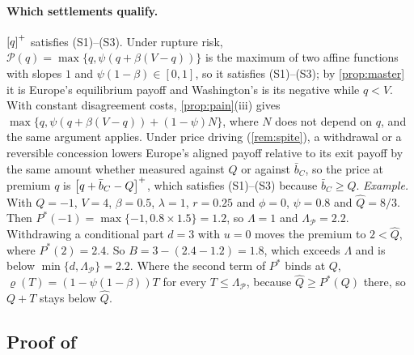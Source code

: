 \paragraph{Which settlements qualify.} $\left[q\right]^{+}$ satisfies (S1)--(S3). Under rupture risk, $\mathcal P(q)=\max\{q,\psi(q+\beta(V-q))\}$ is the maximum of two affine functions with slopes $1$ and $\psi(1-\beta)\in[0,1]$, so it satisfies (S1)--(S3); by \cref{prop:master} it is Europe's equilibrium payoff and Washington's is its negative while $q<V$. With constant disagreement costs, \cref{prop:pain}(iii) gives $\max\{q,\psi(q+\beta(V-q))+(1-\psi)N\}$, where $N$ does not depend on $q$, and the same argument applies. Under price driving (\cref{rem:spite}), a withdrawal or a reversible concession lowers Europe's aligned payoff relative to its exit payoff by the same amount whether measured against $Q$ or against $\bar b_C$, so the price at premium $q$ is $\left[q+\bar b_C-Q\right]^{+}$, which satisfies (S1)--(S3) because $\bar b_C\ge Q$. \emph{Example.} With $Q=-1$, $V=4$, $\beta=0.5$, $\lambda=1$, $r=0.25$ and $\phi=0$, $\psi=0.8$ and $\hat Q=8/3$. Then $P^*(-1)=\max\{-1,0.8\times 1.5\}=1.2$, so $\Lambda=1$ and $\Lambda_{\mathcal P}=2.2$. Withdrawing a conditional part $d=3$ with $u=0$ moves the premium to $2<\hat Q$, where $P^*(2)=2.4$. So $B=3-(2.4-1.2)=1.8$, which exceeds $\Lambda$ and is below $\min\{d,\Lambda_{\mathcal P}\}=2.2$. Where the second term of $P^*$ binds at $Q$, $\varrho(T)=(1-\psi(1-\beta))T$ for every $T\le\Lambda_{\mathcal P}$, because $\hat Q\ge P^*(Q)$ there, so $Q+T$ stays below $\hat Q$.

\subsection{Proof of \texorpdfstring{}{rationing}}

